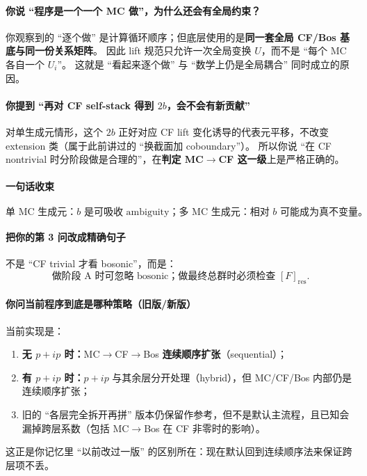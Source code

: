 \documentclass[a4paper,fontset=ubuntu,12pt]{ctexart}
\begin{document}
\paragraph{你说 ``程序是一个一个 MC 做''，为什么还会有全局约束？}
你观察到的 ``逐个做'' 是计算循环顺序；但底层使用的是\textbf{同一套全局 CF/Bos 基底与同一份关系矩阵}。  
因此 lift 规范只允许一次全局变换 $U$，而不是 ``每个 MC 各自一个 $U_i$''。  
这就是 ``看起来逐个做'' 与 ``数学上仍是全局耦合'' 同时成立的原因。

\paragraph{你提到 ``再对 CF self-stack 得到 $2b$，会不会有新贡献''}
对单生成元情形，这个 $2b$ 正好对应 CF lift 变化诱导的代表元平移，不改变 extension 类（属于此前讲过的 ``换截面加 coboundary''）。  
所以你说 ``在 CF nontrivial 时分阶段做是合理的''，在\textbf{判定 MC$\to$CF 这一级}上是严格正确的。

\paragraph{一句话收束}
\begin{equation}
\text{单 MC 生成元：}b\text{ 是可吸收 ambiguity；多 MC 生成元：相对 }b\text{ 可能成为真不变量。}
\label{eq:single-vs-multi-b}
\end{equation}

\paragraph{把你的第 3 问改成精确句子}
不是 ``CF trivial 才看 bosonic''，而是：
\begin{equation}
\text{做阶段 A 时可忽略 bosonic；做最终总群时必须检查 }[F]_{\mathrm{res}}.
\label{eq:stageA-stageB-rule}
\end{equation}

\paragraph{你问当前程序到底是哪种策略（旧版/新版）}
当前实现是：
\begin{enumerate}
\item \textbf{无 $p+ip$ 时：}MC$\to$CF$\to$Bos \textbf{连续顺序扩张}（sequential）；
\item \textbf{有 $p+ip$ 时：}$p+ip$ 与其余层分开处理（hybrid），但 MC/CF/Bos 内部仍是连续顺序扩张；
\item 旧的 ``各层完全拆开再拼'' 版本仍保留作参考，但不是默认主流程，且已知会漏掉跨层系数（包括 MC$\to$Bos 在 CF 非零时的影响）。
\end{enumerate}
这正是你记忆里 ``以前改过一版'' 的区别所在：现在默认回到连续顺序法来保证跨层项不丢。
\end{document}
